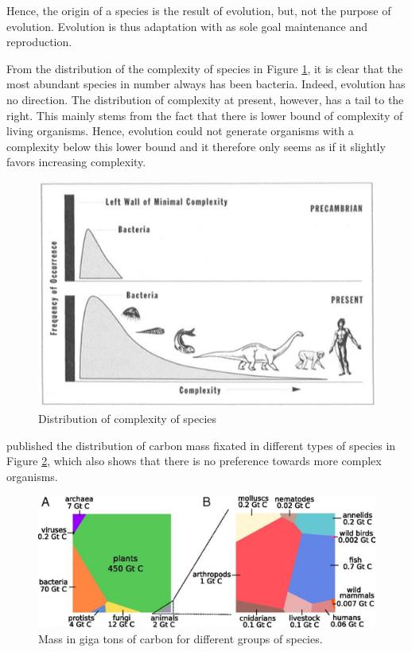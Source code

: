 \documentclass[
  11pt,
]{book}
\begin{document}
Hence, the origin of a species is the result of evolution, but, not the purpose of evolution. Evolution is thus adaptation with as sole goal maintenance and reproduction.

From the distribution of the complexity of species in Figure \ref{fig:distributionComplexity}, it is clear that the most abundant species in number always has been bacteria.
Indeed, evolution has no direction.
The distribution of complexity at present, however, has a tail to the right.
This mainly stems from the fact that there is lower bound of complexity of living organisms. Hence, evolution could not generate organisms with a complexity below this lower bound and it therefore only seems as if it slightly favors increasing complexity.



\begin{figure}

{\centering \includegraphics[width=0.45\linewidth]{./figs/selectionNoDirectionDef} 

}

\caption{Distribution of complexity of species \citep{gould1997}}\label{fig:distributionComplexity}
\end{figure}

\citet{Bar-On2018} published the distribution of carbon mass fixated in different types of species in Figure \ref{fig:carbonFixated}, which also shows that there is no preference towards more complex organisms.



\begin{figure}

{\centering \includegraphics[width=1\linewidth]{./figs/pnas.1711842115fig01} 

}

\caption{Mass in giga tons of carbon for different groups of species. \citep{Bar-On2018}}\label{fig:carbonFixated}
\end{figure}
\end{document}
